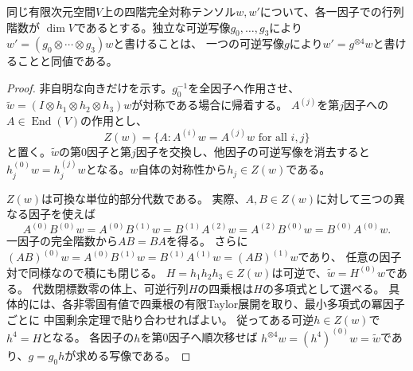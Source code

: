 \begin{lemma}[対称テンソルの独立同値と合同]\label{lem:symmetric-tensor-congruence}
同じ有限次元空間$V$上の四階完全対称テンソル$w,w'$について、各一因子での行列階数が
$\dim V$であるとする。独立な可逆写像$g_0,\ldots,g_3$により
$w'=(g_0\otimes\cdots\otimes g_3)w$と書けることは、
一つの可逆写像$g$により$w'=g^{\otimes4}w$と書けることと同値である。
\end{lemma}
\begin{proof}
非自明な向きだけを示す。$g_0^{-1}$を全因子へ作用させ、
$\widetilde w=(I\otimes h_1\otimes h_2\otimes h_3)w$が対称である場合に帰着する。
$A^{(j)}$を第$j$因子への$A\in\operatorname{End}(V)$の作用とし、
\[
 Z(w)=\{A:A^{(i)}w=A^{(j)}w\text{ for all }i,j\}
\]
と置く。$\widetilde w$の第0因子と第$j$因子を交換し、他因子の可逆写像を消去すると
$h_j^{(0)}w=h_j^{(j)}w$となる。$w$自体の対称性から$h_j\in Z(w)$である。

$Z(w)$は可換な単位的部分代数である。
実際、$A,B\in Z(w)$に対して三つの異なる因子を使えば
\[
 A^{(0)}B^{(0)}w=A^{(0)}B^{(1)}w
 =B^{(1)}A^{(2)}w=A^{(2)}B^{(0)}w
 =B^{(0)}A^{(0)}w.
\]
一因子の完全階数から$AB=BA$を得る。
さらに$(AB)^{(0)}w=A^{(0)}B^{(1)}w=B^{(1)}A^{(1)}w=(AB)^{(1)}w$であり、
任意の因子対で同様なので積にも閉じる。
$H=h_1h_2h_3\in Z(w)$は可逆で、$\widetilde w=H^{(0)}w$である。
代数閉標数零の体上、可逆行列$H$の四乗根は$H$の多項式として選べる。
具体的には、各非零固有値で四乗根の有限Taylor展開を取り、最小多項式の冪因子ごとに
中国剰余定理で貼り合わせればよい。
従ってある可逆$h\in Z(w)$で$h^4=H$となる。
各因子の$h$を第0因子へ順次移せば
$h^{\otimes4}w=(h^4)^{(0)}w=\widetilde w$であり、$g=g_0h$が求める写像である。
\end{proof}


